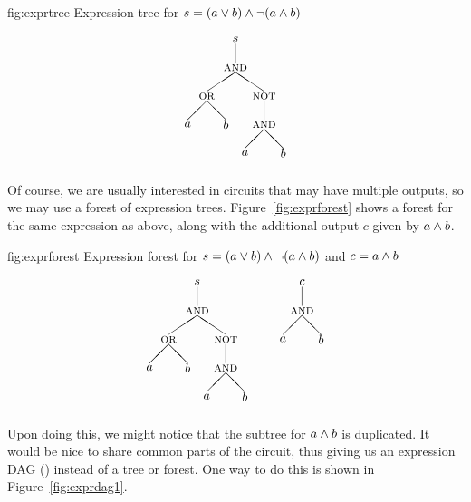 \fig
	{fig:exprtree}
	{Expression tree for $s=(a\vee b)\wedge\lnot(a\wedge b)$}
	{\[ \setlength{\unitlength}{0.75pt}
\begin{picture}(120,140)
\put(10,40){\makebox(0,0){$a$}}
\put(50,40){\makebox(0,0){$b$}}
\put(30,70){\makebox(0,0){\textsc{or}}}
\put(10,45){\line(1,1){20}}
\put(50,45){\line(-1,1){20}}
\put(70,10){\makebox(0,0){$a$}}
\put(110,10){\makebox(0,0){$b$}}
\put(90,40){\makebox(0,0){\textsc{and}}}
\put(70,15){\line(1,1){20}}
\put(110,15){\line(-1,1){20}}
\put(90,70){\makebox(0,0){\textsc{not}}}
\put(90,45){\line(0,1){20}}
\put(60,100){\makebox(0,0){\textsc{and}}}
\put(30,75){\line(3,2){30}}
\put(90,75){\line(-3,2){30}}
\put(60,130){\makebox(0,0){$s$}}
\put(60,105){\line(0,1){20}}
\end{picture} \]}

Of course, we are usually interested in circuits that may have multiple outputs, so we may use a forest of expression trees. Figure~\ref{fig:exprforest} shows a forest for the same expression as above, along with the additional output $c$ given by $a\wedge b$.

\fig
	{fig:exprforest}
	{Expression forest for $s=(a\vee b)\wedge\lnot(a\wedge b)$ and $c=a\wedge b$}
	{\[ \setlength{\unitlength}{0.75pt}
\begin{picture}(200,140)
\put(10,40){\makebox(0,0){$a$}}
\put(50,40){\makebox(0,0){$b$}}
\put(30,70){\makebox(0,0){\textsc{or}}}
\put(10,45){\line(1,1){20}}
\put(50,45){\line(-1,1){20}}
\put(70,10){\makebox(0,0){$a$}}
\put(110,10){\makebox(0,0){$b$}}
\put(90,40){\makebox(0,0){\textsc{and}}}
\put(70,15){\line(1,1){20}}
\put(110,15){\line(-1,1){20}}
\put(90,70){\makebox(0,0){\textsc{not}}}
\put(90,45){\line(0,1){20}}
\put(60,100){\makebox(0,0){\textsc{and}}}
\put(30,75){\line(3,2){30}}
\put(90,75){\line(-3,2){30}}
\put(60,130){\makebox(0,0){$s$}}
\put(60,105){\line(0,1){20}}
\put(150,70){\makebox(0,0){$a$}}
\put(190,70){\makebox(0,0){$b$}}
\put(170,100){\makebox(0,0){\textsc{and}}}
\put(150,75){\line(1,1){20}}
\put(190,75){\line(-1,1){20}}
\put(170,130){\makebox(0,0){$c$}}
\put(170,105){\line(0,1){20}}
\end{picture} \]}

Upon doing this, we might notice that the subtree for $a\wedge b$ is duplicated. It would be nice to share common parts of the circuit, thus giving us an expression DAG () instead of a tree or forest. One way to do this is shown in Figure~\ref{fig:exprdag1}.


